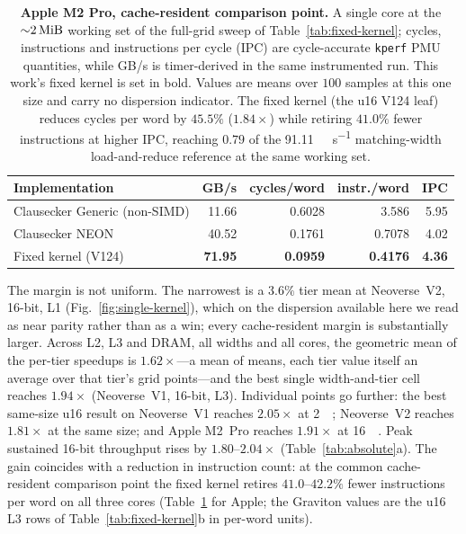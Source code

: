 \documentclass[fleqn,10pt]{wlscirep}
\begin{document}
\begin{table}[!t]\centering
\caption{\label{tab:apple}\textbf{Apple M2 Pro, cache-resident comparison point.} A single core at the ${\sim}\SI{2}{\mebi\byte}$ working set of the full-grid sweep of Table~\ref{tab:fixed-kernel}; cycles, instructions and instructions per cycle (IPC) are cycle-accurate \texttt{kperf} PMU quantities, while GB/s is timer-derived in the same instrumented run. This work's fixed kernel is set in bold. Values are means over $100$ samples at this one size and carry no dispersion indicator. The fixed kernel (the u16 V124 leaf) reduces cycles per word by $45.5\%$ ($1.84\times$) while retiring $41.0\%$ fewer instructions at higher IPC, reaching $0.79$ of the \SI{91.11}{\giga\byte\per\second} matching-width load-and-reduce reference at the same working set.}
\begin{tabular}{@{}l | r r r r@{}}
\toprule
Implementation & GB/s & cycles/word & instr./word & IPC\\
\midrule
Clausecker Generic (non-SIMD) & 11.66 & 0.6028 & 3.586 & 5.95\\
Clausecker NEON         & 40.52 & 0.1761 & 0.7078 & 4.02\\
Fixed kernel (V124) & \textbf{71.95} & \textbf{0.0959} & \textbf{0.4176} & \textbf{4.36}\\
\bottomrule
\end{tabular}
\end{table}

The margin is not uniform. The narrowest is a $3.6\%$ tier mean at Neoverse~V2, 16-bit, L1 (Fig.~\ref{fig:single-kernel}), which on the dispersion available here we read as near parity rather than as a win; every cache-resident margin is substantially larger. Across L2, L3 and DRAM, all widths and all cores, the geometric mean of the per-tier speedups is $1.62\times$---a mean of means, each tier value itself an average over that tier's grid points---and the best single width-and-tier cell reaches $1.94\times$ (Neoverse~V1, 16-bit, L3). Individual points go further: the best same-size u16 result on Neoverse~V1 reaches $2.05\times$ at \SI{2}{\mebi\byte}; Neoverse~V2 reaches $1.81\times$ at the same size; and Apple M2~Pro reaches $1.91\times$ at \SI{16}{\mebi\byte}. Peak sustained 16-bit throughput rises by $1.80$--$2.04\times$ (Table~\ref{tab:absolute}a). The gain coincides with a reduction in instruction count: at the common cache-resident comparison point the fixed kernel retires $41.0$--$42.2\%$ fewer instructions per word on all three cores (Table~\ref{tab:apple} for Apple; the Graviton values are the u16 L3 rows of Table~\ref{tab:fixed-kernel}b in per-word units).
\end{document}
